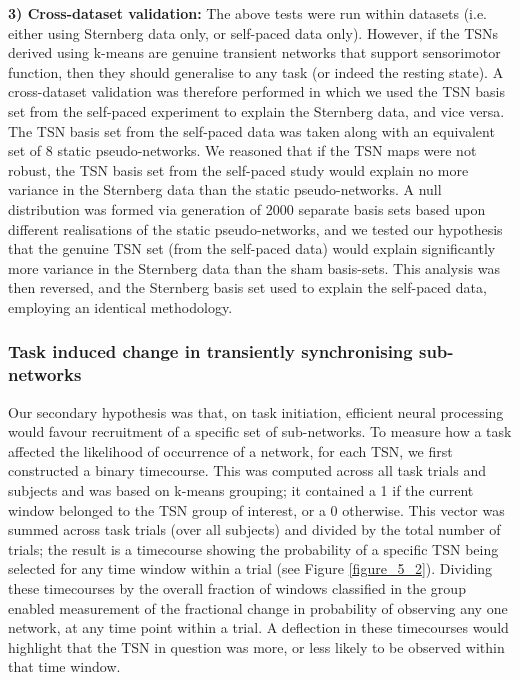 \textbf{3) Cross-dataset validation:}
The above tests were run within datasets (i.e. either using Sternberg data only, or self-paced data only). However, if the TSNs derived using k-means are genuine transient networks that support sensorimotor function, then they should generalise to any task (or indeed the resting state). A cross-dataset validation was therefore performed in which we used the TSN basis set from the self-paced experiment to explain the Sternberg data, and vice versa. The TSN basis set from the self-paced data was taken along with an equivalent set of 8 static pseudo-networks. We reasoned that if the TSN maps were not robust, the TSN basis set from the self-paced study would explain no more variance in the Sternberg data than the static pseudo-networks. A null distribution was formed via generation of 2000 separate basis sets based upon different realisations of the static pseudo-networks, and we tested our hypothesis that the genuine TSN set (from the self-paced data) would explain significantly more variance in the Sternberg data than the sham basis-sets. This analysis was then reversed, and the Sternberg basis set used to explain the self-paced data, employing an identical methodology.

\subsubsection{Task induced change in transiently synchronising sub-networks}
Our secondary hypothesis was that, on task initiation, efficient neural processing would favour recruitment of a specific set of sub-networks. To measure how a task affected the likelihood of occurrence of a network, for each TSN, we first constructed a binary timecourse. This was computed across all task trials and subjects and was based on k-means grouping; it contained a 1 if the current window belonged to the TSN group of interest, or a 0 otherwise. This vector was summed across task trials (over all subjects) and divided by the total number of trials; the result is a timecourse showing the probability of a specific TSN being selected for any time window within a trial (see Figure \ref{figure_5_2}). Dividing these timecourses by the overall fraction of windows classified in the group enabled measurement of the fractional change in probability of observing any one network, at any time point within a trial. A deflection in these timecourses would highlight that the TSN in question was more, or less likely to be observed within that time window.

